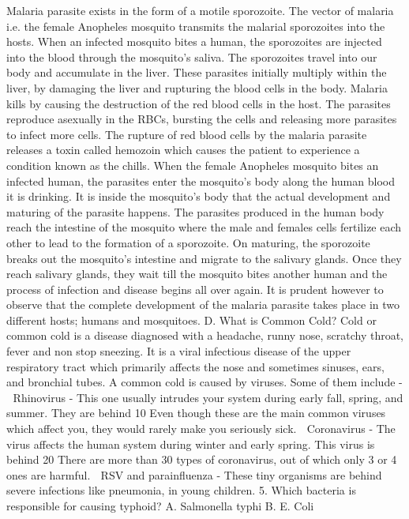 Malaria parasite exists in the form of a motile sporozoite. The
vector of malaria i.e. the female Anopheles mosquito transmits the
malarial sporozoites into the hosts. When an infected mosquito bites
a human, the sporozoites are injected into the blood through the
mosquito’s saliva. The sporozoites travel into our body and
accumulate in the liver. These parasites initially multiply within the
liver, by damaging the liver and rupturing the blood cells in the body.
Malaria kills by causing the destruction of the red blood cells in the
host. The parasites reproduce asexually in the RBCs, bursting the
cells and releasing more parasites to infect more cells. The rupture
of red blood cells by the malaria parasite releases a toxin called
hemozoin which causes the patient to experience a condition known
as the chills.
When the female Anopheles mosquito bites an infected human, the
parasites enter the mosquito’s body along the human blood it is
drinking. It is inside the mosquito’s body that the actual
development and maturing of the parasite happens. The parasites
produced in the human body reach the intestine of the mosquito
where the male and females cells fertilize each other to lead to the
formation of a sporozoite. On maturing, the sporozoite breaks out
the mosquito’s intestine and migrate to the salivary glands. Once
they reach salivary glands, they wait till the mosquito bites another
human and the process of infection and disease begins all over again.
It is prudent however to observe that the complete development of
the malaria parasite takes place in two different hosts; humans and
mosquitoes.
D. What is Common Cold?
Cold or common cold is a disease diagnosed with a headache, runny
nose, scratchy throat, fever and non stop sneezing. It is a viral
infectious disease of the upper respiratory tract which primarily
affects the nose and sometimes sinuses, ears, and bronchial tubes.
A common cold is caused by viruses. Some of them include -
 Rhinovirus - This one usually intrudes your system during early
fall, spring, and summer. They are behind 10%
Even though these are the main common viruses which affect
you, they would rarely make you seriously sick.
 Coronavirus - The virus affects the human system during
winter and early spring. This virus is behind 20%
There are more than 30 types of coronavirus, out of which only
3 or 4 ones are harmful.
 RSV and parainfluenza - These tiny organisms are behind
severe infections like pneumonia, in young children.
5. Which bacteria is responsible for causing typhoid?
A. Salmonella typhi
B. E. Coli
